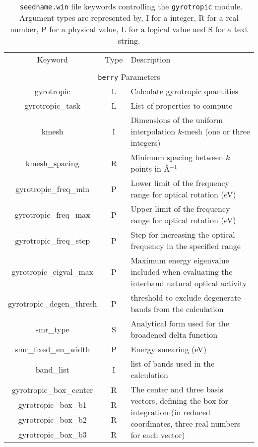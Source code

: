 \begin{table}[h!]
\begin{center}
\begin{tabular}{|c|c|p{6cm}|}
  \hline
  Keyword & Type & Description \\
  &      &             \\
  \hline\hline
  \multicolumn{3}{|c|}{{\tt berry} Parameters} \\
  \hline
  {\sc gyrotropic}  & L & Calculate gyrotropic quantities \\
  {\sc gyrotropic\_task}& L  & List of properties to compute \\
  {\sc [gyrotropic\_]kmesh} & I & Dimensions of the uniform interpolation $k$-mesh 
  (one or three integers)\\ 
  {\sc [gyrotropic\_]kmesh\_spacing}& R & Minimum spacing between $k$ points in 
  \AA$^{-1}$\\
  {\sc gyrotropic\_freq\_min} & P & Lower limit of the frequency range for
  optical rotation (eV) \\
  {\sc gyrotropic\_freq\_max}& P & Upper limit of the frequency range for
  optical rotation (eV) \\
  {\sc gyrotropic\_freq\_step}& P &  Step for increasing
the optical frequency in the specified range\\
  {\sc gyrotropic\_eigval\_max}& P &  Maximum energy eigenvalue
  included when evaluating the interband natural optical activity\\
  {\sc gyrotropic\_degen\_thresh}& P &  threshold to exclude degenerate bands from the calculation\\
  {\sc [gyrotropic\_]smr\_type} & S & Analytical form used for the broadened delta function\\  
  {\sc [gyrotropic\_]smr\_fixed\_en\_width} & P  & Energy smearing (eV) \\\hline
  {\sc [gyrotropic\_]band\_list} & I  & list of bands used in the calculation \\\hline
  {\sc gyrotropic\_box\_center} & R  &  \multirow{4}{6cm}{The center and three basis vectors, %
defining the box for integration (in reduced coordinates, three real numbers for each vector) } \\
  {\sc gyrotropic\_box\_b1} & R  &  \\
  {\sc gyrotropic\_box\_b2} & R  &  \\
  {\sc gyrotropic\_box\_b3} & R  &  \\
  \hline
\end{tabular}
\caption[Parameter file keywords controlling the Gyrotropic module.]  {{\tt
    seedname.win} file keywords controlling the {\tt gyrotropic}
  module. Argument types are represented by, I for a integer, R for a
  real number, P for a physical value, L for a logical value and S for
  a text string.}
\label{parameter_keywords_gyrotropic}
\end{center}
\end{table}



